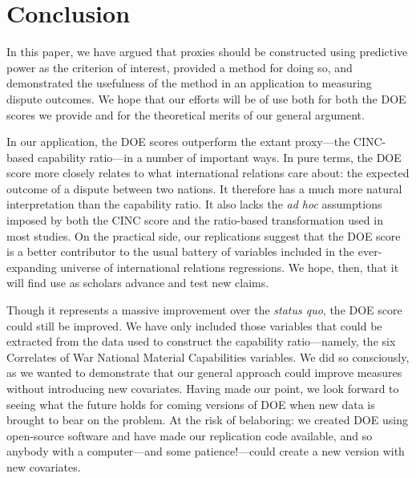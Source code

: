 \section{Conclusion}
In this paper, we have argued that proxies should be constructed using predictive power as the criterion of interest, provided a method for doing so, and demonstrated the usefulness of the method in an application to measuring dispute outcomes.  We hope that our efforts will be of use both for both the DOE scores we provide and for the theoretical merits of our general argument.

In our application, the DOE scores outperform the extant proxy---the CINC-based capability ratio---in a number of important ways.  In pure terms, the DOE score more closely relates to what international relations care about:  the expected outcome of a dispute between two nations.  It therefore has a much more natural interpretation than the capability ratio.  It also lacks the \emph{ad hoc} assumptions imposed by both the CINC score and the ratio-based transformation used in most studies.  On the practical side, our replications suggest that the DOE score is a better contributor to the usual battery of variables included in the ever-expanding universe of international relations regressions.  We hope, then, that it will find use as scholars advance and test new claims.  

Though it represents a massive improvement over the \emph{status quo}, the DOE score could still be improved.  We have only included those variables that could be extracted from the data used to construct the capability ratio---namely, the six Correlates of War National Material Capabilities variables.  We did so consciously, as we wanted to demonstrate that our general approach could improve measures without introducing new covariates.  Having made our point, we look forward to seeing what the future holds for coming versions of DOE when new data is brought to bear on the problem.  At the risk of belaboring:  we created DOE using open-source software and have made our replication code available, and so anybody with a computer---and some patience!---could create a new version with new covariates.

